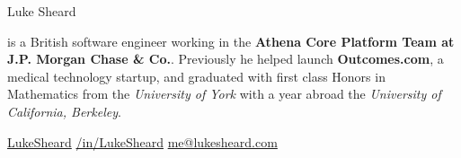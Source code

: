 
\newcommand{\social}[3]{{
#1
\hspace{3pt}
\href{#2}{#3}
}}

{\Huge
  Luke Sheard
}

{\vspace{10pt}
  is a British software engineer working in the \textbf{Athena Core Platform Team at J.P. Morgan Chase \& Co.}. 
  Previously he helped launch \textbf{Outcomes.com}, a medical technology startup, 
  and graduated with first class Honors in Mathematics from the \textit{University of York}
  with a year abroad the \textit{University of California, Berkeley}.
}

\vspace{5pt}

\hspace{3pt}
\href{https://www.github.com/LukeSheard}{LukeSheard}
\hspace{20pt}
\hspace{3pt}
\href{http://www.linkedin.com/in/lukesheard}{/in/LukeSheard}
\hspace{20pt}
\hspace{3pt}
\href{mailto:me@lukesheard.com}{me@lukesheard.com}